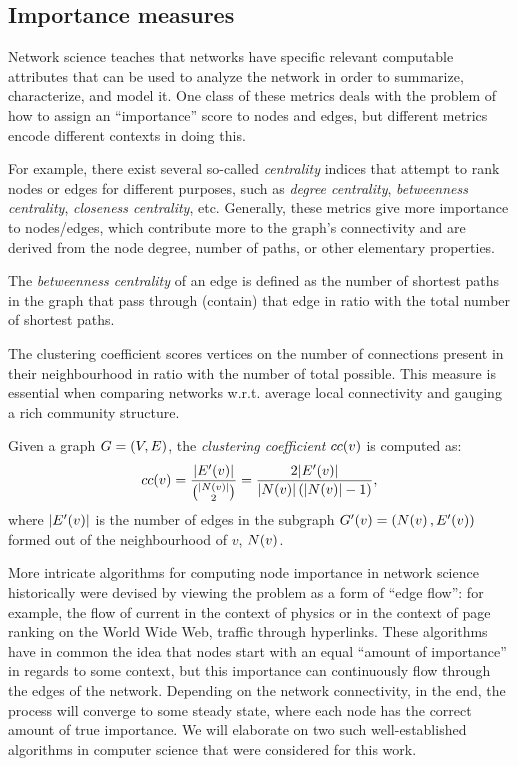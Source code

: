 \subsection{Importance measures}

Network science teaches that networks have specific relevant computable attributes that can be used to analyze the network in order to summarize, characterize, and model it. One class of these metrics deals with the problem of how to assign an \enquote{importance} score to nodes and edges, but different metrics encode different contexts in doing this.

For example, there exist several so-called \emph{centrality} indices that attempt to rank nodes or edges for different purposes, such as \emph{degree centrality}, \emph{betweenness centrality}, \emph{closeness centrality}, etc. Generally, these metrics give more importance to nodes/edges, which contribute more to the graph's connectivity and are derived from the node degree, number of paths, or other elementary properties.

\begin{definition}
The \emph{betweenness centrality} of an edge is defined as the number of shortest paths in the graph that pass through (contain) that edge in ratio with the total number of shortest paths.
\end{definition}

The clustering coefficient scores vertices on the number of connections present in their neighbourhood in ratio with the number of total possible. This measure is essential when comparing networks w.r.t. average local connectivity and gauging a rich community structure.

\begin{definition}
Given a graph $G=\mathopen{}\left(V, E\right)$, the \emph{clustering coefficient} $cc\mathopen{}\left(v\right)$ is computed as: \begin{equation}
cc\mathopen{}\left(v\right)=\frac{\mathopen{}\left|E'\mathopen{}\left(v\right)\right|}{{\mathopen{}\left|N\mathopen{}\left(v\right)\right| \choose 2}} = \frac{2\mathopen{}\left|E'\mathopen{}\left(v\right)\right|}{\mathopen{}\left|N\mathopen{}\left(v\right)\right|\mathopen{}\left(\mathopen{}\left|N\mathopen{}\left(v\right)\right|-1\right)},\end{equation}
where $\mathopen{}\left|E'\mathopen{}\left(v\right)\right|$ is the number of edges in the subgraph $G'\mathopen{}\left(v\right)=\mathopen{}\left(N\mathopen{}\left(v\right), E'\mathopen{}\left(v\right)\right)$ formed out of the neighbourhood of $v$, $N\mathopen{}\left(v\right)$.
\end{definition}

More intricate algorithms for computing node importance in network science historically were devised by viewing the problem as a form of \enquote{edge flow}: for example, the flow of current in the context of physics or in the context of page ranking on the World Wide Web, traffic through hyperlinks. These algorithms have in common the idea that nodes start with an equal \enquote{amount of importance} in regards to some context, but this importance can continuously flow through the edges of the network. Depending on the network connectivity, in the end, the process will converge to some steady state, where each node has the correct amount of true importance. We will elaborate on two such well-established algorithms in computer science that were considered for this work.

